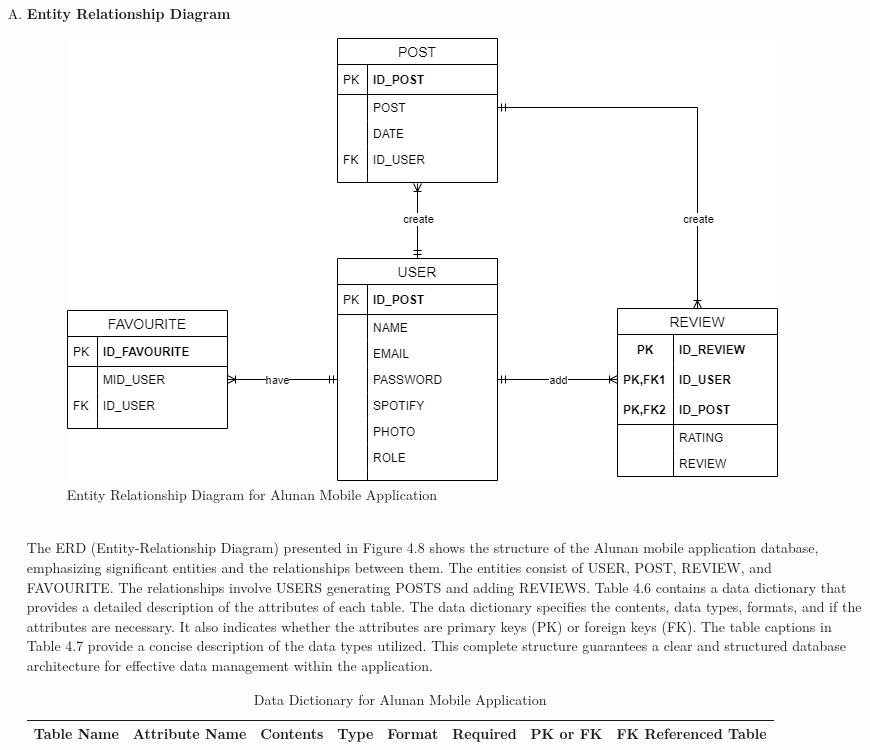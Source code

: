 \begin{enumerate}[A.]
    \item \textbf{Entity Relationship Diagram}
    \begin{figure}[h]
        \centering
        \includegraphics[width=0.9\linewidth]{mainmatter/images/erd.png}
        \caption{Entity Relationship Diagram for Alunan Mobile Application}
        \label{fig:myfig47}
    \end{figure} \\
    The ERD (Entity-Relationship Diagram) presented in Figure 4.8 shows the structure of the Alunan mobile application database, emphasizing significant entities and the relationships between them. The entities consist of USER, POST, REVIEW, and FAVOURITE. The relationships involve USERS generating POSTS and adding REVIEWS. Table 4.6 contains a data dictionary that provides a detailed description of the attributes of each table. The data dictionary specifies the contents, data types, formats, and if the attributes are necessary. It also indicates whether the attributes are primary keys (PK) or foreign keys (FK). The table captions in Table 4.7 provide a concise description of the data types utilized. This complete structure guarantees a clear and structured database architecture for effective data management within the application.
    \pagebreak
    \begin{landscape}
    \begin{longtable}
        {|>{\centering\arraybackslash}m{2.5cm}|>{\centering\arraybackslash}m{3cm}|>{\centering\arraybackslash}m{4cm}|>{\centering\arraybackslash}m{3cm}|>{\centering\arraybackslash}m{2cm}|>{\centering\arraybackslash}m{2cm}|>{\centering\arraybackslash}m{1cm}|>{\centering\arraybackslash}m{3cm}|}
        \caption{\centering Data Dictionary for Alunan Mobile Application} \\
        \hline
        \textbf{Table Name} & \textbf{Attribute Name} & \textbf{Contents} & \textbf{Type} & \textbf{Format} & \textbf{Required} & \textbf{PK or FK} & \textbf{FK Referenced Table} \\ \hline

\end{longtable}
\end{landscape}
\end{enumerate}

